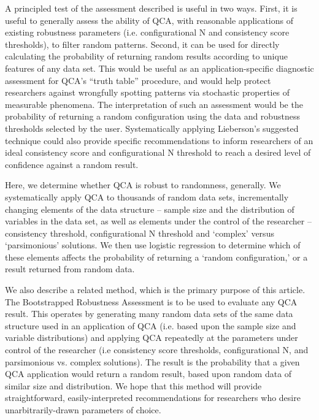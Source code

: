 \documentclass[12pt]{article}
\begin{document}
{{{{%

A principled test of the assessment \citet{lieberson_2004} described is useful in two ways. First, it is useful to generally assess the ability of QCA, with reasonable applications of existing robustness parameters (i.e. configurational N and consistency score thresholds), to filter random patterns. Second, it can be used for directly calculating the probability of returning random results according to unique features of any data set. This would be useful as an application-specific diagnostic assessment for QCA's ``truth table'' procedure, and would help protect researchers against wrongfully spotting patterns via stochastic properties of measurable phenomena. The interpretation of such an assessment would be the probability of returning a random configuration using the data and robustness thresholds selected by the user. Systematically applying Lieberson's suggested technique could also provide specific recommendations to inform researchers of an ideal consistency score and configurational N threshold to reach a desired level of confidence against a random result. 


Here, we determine whether QCA is robust to randomness, generally. We systematically apply QCA to thousands of random data sets, incrementally changing elements of the data structure -- sample size and the distribution of variables in the data set, as well as elements under the control of the researcher -- consistency threshold, configurational N threshold and `complex' versus `parsimonious' solutions. We then use logistic regression to determine which of these elements affects the probability of returning a `random configuration,' or a result returned from random data. 

We also describe a related method, which is the primary purpose of this article. The Bootstrapped Robustness Assessment is to be used to evaluate any QCA result. This operates by generating many random data sets of the same data structure used in an application of QCA (i.e. based upon the sample size and variable distributions) and applying QCA repeatedly at the parameters under control of the researcher (i.e consistency score thresholds, configurational N, and parsimonious vs. complex solutions). The result is the probability that a given QCA application would return a random result, based upon random data of similar size and distribution. We hope that this method will provide straightforward, easily-interpreted recommendations for researchers who desire unarbitrarily-drawn parameters of choice. 




}}}}
\end{document}
